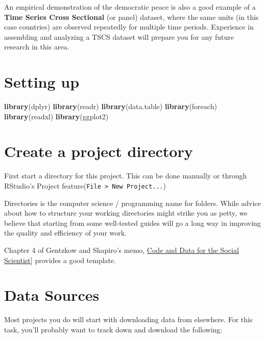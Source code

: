 \documentclass[]{book}
\newenvironment{Shaded}{\begin{snugshade}}{\end{snugshade}}
\newcommand{\KeywordTok}[1]{\textcolor[rgb]{0.13,0.29,0.53}{\textbf{#1}}}
\newcommand{\NormalTok}[1]{#1}
\theoremstyle{definition}
\theoremstyle{definition}
\theoremstyle{definition}
\theoremstyle{remark}
\begin{document}
An empirical demonstration of the democratic peace is also a good
example of a \textbf{Time Series Cross Sectional} (or panel) dataset,
where the same units (in this case countries) are observed repeatedly
for multiple time periods. Experience in assembling and analyzing a TSCS
dataset will prepare you for any future research in this area.

\section{Setting up}\label{setting-up}

\begin{Shaded}
\begin{Highlighting}[]
\KeywordTok{library}\NormalTok{(dplyr)}
\KeywordTok{library}\NormalTok{(readr)}
\KeywordTok{library}\NormalTok{(data.table)}
\KeywordTok{library}\NormalTok{(foreach)}
\KeywordTok{library}\NormalTok{(readxl)}
\KeywordTok{library}\NormalTok{(ggplot2)}
\end{Highlighting}
\end{Shaded}

\section{Create a project directory}\label{create-a-project-directory}

First start a directory for this project. This can be done manually or
through RStudio's Project
feature(\texttt{File\ \textgreater{}\ New\ Project...})

Directories is the computer science / programming name for folders.
While advice about how to structure your working directories might
strike you as petty, we believe that starting from some well-tested
guides will go a long way in improving the quality and efficiency of
your work.

Chapter 4 of Gentzkow and Shapiro's memo,
\href{https://web.stanford.edu/~gentzkow/research/CodeAndData.pdf}{Code
and Data for the Social Scientist}{]} provides a good template.

\section{Data Sources}\label{data-sources}

Most projects you do will start with downloading data from elsewhere.
For this task, you'll probably want to track down and download the
following:
\end{document}
